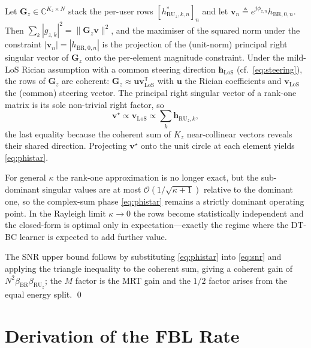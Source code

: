 \documentclass[journal]{IEEEtran}
\newcommand{\vect}[1]{\bm{#1}}
\newcommand{\mat}[1]{\mathbf{#1}}
\newcommand{\C}{\mathbb{C}}
\begin{document}
Let $\mat{G}_z\!\in\!\C^{K_z\times N}$ stack the per-user rows
$[h_{\mathrm{RU}_z,k,n}^*]_n$ and let
$\vect{v}_n\!\triangleq\!e^{j\phi_{z,n}} h_{\mathrm{BR},0,n}$.
Then $\sum_k |g_{z,k}|^2 = \|\mat{G}_z\vect{v}\|^2$, and the
maximiser of the squared norm under the constraint
$|\vect{v}_n|\!=\!|h_{\mathrm{BR},0,n}|$ is the projection of the
(unit-norm) principal right singular vector of $\mat{G}_z$ onto the
per-element magnitude constraint. Under the mild-LoS Rician
assumption with a common steering direction $\vect{h}_{\mathrm{LoS}}$
(cf.\ \eqref{eq:steering}), the rows of $\mat{G}_z$ are coherent:
$\mat{G}_z\!\approx\!\vect{u}\vect{v}_{\mathrm{LoS}}^{\mathsf{T}}$
with $\vect{u}$ the Rician coefficients and
$\vect{v}_{\mathrm{LoS}}$ the (common) steering vector. The
principal right singular vector of a rank-one matrix is its sole
non-trivial right factor, so
\[
  \vect{v}^{\star}\!\propto\!\vect{v}_{\mathrm{LoS}}\!\propto\!
  \sum_k \vect{h}_{\mathrm{RU}_z,k},
\]
the last equality because the coherent sum of $K_z$ near-collinear
vectors reveals their shared direction. Projecting $\vect{v}^{\star}$
onto the unit circle at each element yields \eqref{eq:phistar}.

For general $\kappa$ the rank-one approximation is no longer exact,
but the sub-dominant singular values are at most
$\mathcal{O}(1/\sqrt{\kappa+1})$ relative to the dominant one, so
the complex-sum phase \eqref{eq:phistar} remains a strictly
dominant operating point. In the Rayleigh limit $\kappa\!\to\!0$
the rows become statistically independent and the closed-form is
optimal only in expectation---exactly the regime where the
DT-BC learner is expected to add further value.

The SNR upper bound follows by substituting \eqref{eq:phistar}
into \eqref{eq:snr} and applying the triangle inequality to the
coherent sum, giving a coherent gain of
$N^2\beta_{\mathrm{BR}}\beta_{\mathrm{RU}_z}$; the $M$ factor is
the MRT gain and the $1/2$ factor arises from the equal energy
split. \qed

\section{Derivation of the FBL Rate}
\label{app:fbl}
\end{document}
